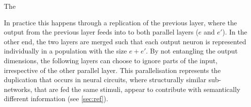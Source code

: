 The 

In practice this happens through a replication of the previous layer, where
the output from the previous layer feeds into to both parallel 
layers ($e$ and $e'$).
In the other end, the two layers are merged such that each output neuron
is represented individually in a population with the size $e + e'$.
By not entangling the output dimensions, the following layers can choose
to ignore parts of the input, irrespective of the other parallel layer.
This parallelisation represents the duplication that occurs
in neural circuits, where structurally similar sub-networks, that are
fed the same stimuli, appear to contribute with semantically different
information (see \ref{sec:ref}).







